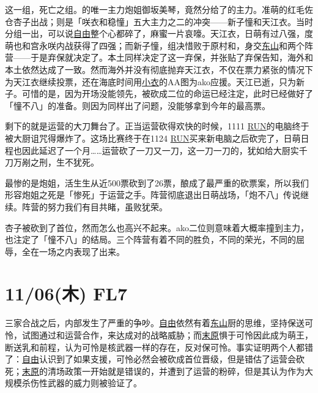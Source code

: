这一组，死亡之组。的唯一主力炮姐御坂美琴，竟然分给了的主力。准萌的红毛佐仓杏子出战；则是「咲衣和稳憧」五大主力之二的冲突——新子憧和天江衣。当时分组一出，可以说\uline{自由}整个心都碎了，麻蜜一片哀嚎。天江衣，日萌有过八强，度萌也和宫永咲内战获得了四强；而新子憧，组决惜败于原村和，身交\uline{东山}和两个阵营——于是弃保就决定了。本土同样决定了这一弃保，并张贴了弃保告知，海外和本土依然达成了一致。然而海外并没有彻底抛弃天江衣，不仅在票力紧张的情况下为天江衣继续投票，还在海底时间用\uline{小衣}的AA图为ako应援。天江已逝，只为新子。可惜的是，因为开场没能领先，被砍成二位的命运已经注定，此时已经做好了「憧不八」的准备。则因为同样出了问题，没能够拿到今年的最高票。

剩下的就是运营的大刀舞台了。正当运营砍得欢快的时候，1111 \uline{RUN}的电脑终于被大厨诅咒得爆炸了。这场比赛终于在1124 \uline{RUN}买来新电脑之后砍完了，日萌日程也因此延迟了一个月……运营砍了一刀又一刀，这一刀一刀的，犹如给大厨实千刀万剐之刑，生不犹死。

最惨的是炮姐，活生生从近500票砍到了26票，酿成了最严重的砍票案，所以我们形容炮姐之死是「惨死」于运营之手。阵营彻底退出日萌战场，「炮不八」传说继续。阵营的努力我们有目共睹，虽败犹荣。

杏子被砍到了首位，然而怎么也高兴不起来。ako二位则意味着大概率撞到主力，也注定了「憧不八」的结局。三个阵营有着不同的胜负，不同的荣光，不同的屈辱，全在一场之内表现了出来。

\section{11/06(木) FL7}


三家合战之后，内部发生了严重的争吵。\uline{自由}依然有着\uline{东山}厨的思维，坚持保送可怜，试图通过和运营合作，来达成对的战略威胁；而\uline{末原}惧于可怜因此成为萌王，断送乳和前程，认为可怜是核武器一样的存在，反对保可怜。事实证明两个人都错了：\uline{自由}认识到了如果支援，可怜必然会被砍成首位晋级，但是错估了运营会砍死；\uline{末原}的清场政策一开始就是错误的，并遭到了运营的粉碎，但是其认为作为大规模杀伤性武器的威力则被验证了。

